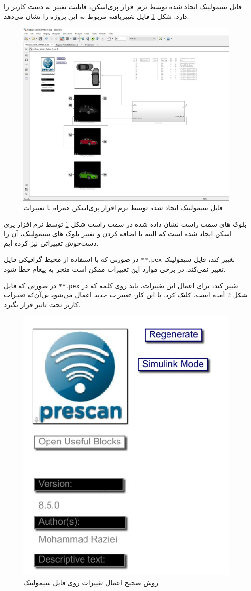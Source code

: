 فایل سیمولینک ایجاد شده توسط نرم افزار پری‌اسکن، قابلیت تغییر به دست کاربر را دارد. شکل 
\ref{fig:simulink-firstview}
فایل تغییر‌یافته مربوط به این پروژه را نشان می‌دهد.


\begin{figure}
	\centering
	\includegraphics[width=0.7\linewidth]{Figures/simulink/first_view}
	\caption{فایل سیمولینک ایجاد شده توسط نرم افزار پری‌اسکن همراه با تغییرات}
	\label{fig:simulink-firstview}
\end{figure}




بلوک های سمت راست نشان داده شده در سمت راست شکل
\ref{fig:simulink-firstview}
توسط نرم افزار پری اسکن ایجاد شده است که البته با اضافه کردن و تغییر بلوک های سیمولینک، آن را دست‌خوش تغییراتی نیز کرده ایم. 

در صورتی که با استفاده از محیط گرافیکی  فایل \texttt{**.pex} تغییر کند، فایل سیمولینک تغییر نمی‌کند. در برخی موارد این تغییرات ممکن است منجر به پیغام خطا شود.

\begin{remark}\label{remark:Regenerate}
	در صورتی که فایل
	\texttt{**.pex}
	تغییر کند، برای اعمال این تغییرات، باید روی کلمه 
	که در شکل 
	\ref{fig:simulink-generate}
	آمده است، کلیک کرد. با این کار، تغییرات جدید اعمال می‌شود بی‌آن‌که تغییرات کاربر تحت تاثیر قرار بگیرد.
\end{remark}

\begin{figure}
	\centering
	\includegraphics[width=0.4\linewidth]{Figures/simulink/generate}
	\caption{روش صحیح اعمال تغییرات روی فایل سیمولینک}
	\label{fig:simulink-generate}
\end{figure}

